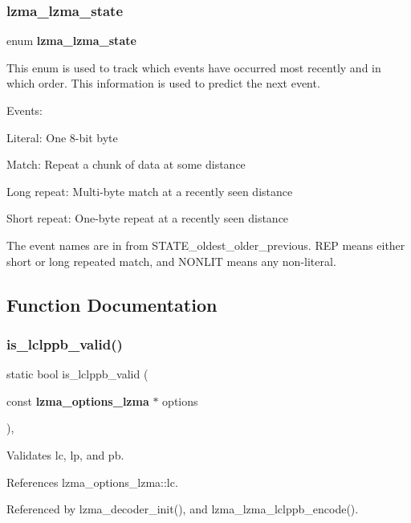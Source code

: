 \subsubsection{lzma\+\_\+lzma\+\_\+state}
{\footnotesize\ttfamily enum \textbf{ lzma\+\_\+lzma\+\_\+state}}

This enum is used to track which events have occurred most recently and in which order. This information is used to predict the next event.

Events\+:
\begin{DoxyItemize}
\item Literal\+: One 8-\/bit byte
\item Match\+: Repeat a chunk of data at some distance
\item Long repeat\+: Multi-\/byte match at a recently seen distance
\item Short repeat\+: One-\/byte repeat at a recently seen distance
\end{DoxyItemize}

The event names are in from S\+T\+A\+T\+E\+\_\+oldest\+\_\+older\+\_\+previous. R\+EP means either short or long repeated match, and N\+O\+N\+L\+IT means any non-\/literal. 

\subsection{Function Documentation}
\mbox{\label{lzma__common_8h_aedd478d0358af2297a6cac1d73540e85}} 
\subsubsection{is\+\_\+lclppb\+\_\+valid()}
{\footnotesize\ttfamily static bool is\+\_\+lclppb\+\_\+valid (\begin{DoxyParamCaption}\item[{const \textbf{ lzma\+\_\+options\+\_\+lzma} $\ast$}]{options }\end{DoxyParamCaption})\hspace{0.3cm}{\ttfamily [inline]}, {\ttfamily [static]}}



Validates lc, lp, and pb. 



References lzma\+\_\+options\+\_\+lzma\+::lc.



Referenced by lzma\+\_\+decoder\+\_\+init(), and lzma\+\_\+lzma\+\_\+lclppb\+\_\+encode().

